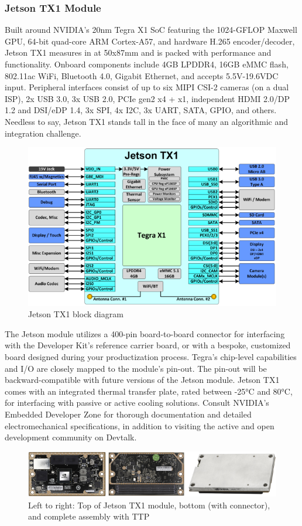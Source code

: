         \subsubsection{Jetson TX1 Module}
            Built around NVIDIA’s 20nm Tegra X1 SoC featuring the 1024-GFLOP Maxwell GPU, 64-bit quad-core ARM Cortex-A57, and hardware H.265 encoder/decoder, Jetson TX1 measures in at 50x87mm and is packed with performance 
            and functionality. Onboard components include 4GB LPDDR4, 16GB eMMC flash, 802.11ac WiFi, Bluetooth 4.0, Gigabit Ethernet, and accepts 5.5V-19.6VDC input. Peripheral interfaces consist of up to six MIPI CSI-2 cameras 
            (on a dual ISP), 2x USB 3.0, 3x USB 2.0, PCIe gen2 x4 + x1, independent HDMI 2.0/DP 1.2 and DSI/eDP 1.4, 3x SPI, 4x I2C, 3x UART, SATA, GPIO, and others. Needless to say, Jetson TX1 stands tall in the face of many an 
            algorithmic and integration challenge.
            \begin{figure}[H]
                \centering
                \includegraphics[width=0.6\linewidth]{img/TX1.png}
                \caption{Jetson TX1 block diagram}
            \end{figure}The Jetson module utilizes a 400-pin board-to-board connector for interfacing with the Developer Kit’s reference carrier board, or with a bespoke, customized board designed during your productization process. 
            Tegra’s chip-level capabilities and I/O are closely mapped to the module’s pin-out. The pin-out will be backward-compatible with future versions of the Jetson module. Jetson TX1 comes with an integrated thermal transfer 
            plate, rated between -25°C and 80°C, for interfacing with passive or active cooling solutions. Consult NVIDIA’s Embedded Developer Zone for thorough documentation and detailed electromechanical specifications, in addition 
            to visiting the active and open development community on Devtalk.
            \begin{figure}[H]
                \centering
                \includegraphics[width=0.6\linewidth]{img/structure.png}
                \caption{Left to right: Top of Jetson TX1 module, bottom (with connector), and complete assembly with TTP}
            \end{figure}
